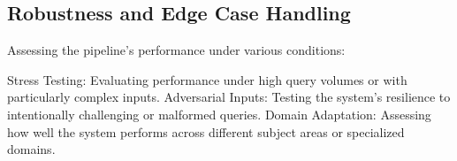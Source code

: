 \subsection{Robustness and Edge Case Handling}\label{subsec:robustness-and-edge-case-handling}

Assessing the pipeline's performance under various conditions:

Stress Testing: Evaluating performance under high query volumes or with particularly complex inputs.
Adversarial Inputs: Testing the system's resilience to intentionally challenging or malformed queries.
Domain Adaptation: Assessing how well the system performs across different subject areas or specialized domains.
%
%
%
%
%
%
%
%
%
%
%
%
